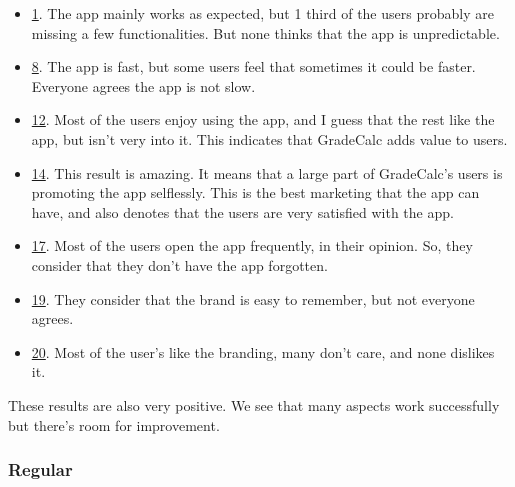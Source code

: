 \begin{itemize}[noitemsep]
    \item \hyperref[fig:question-plot-1]{1}. 
        The app mainly works as expected, but 1 third of the users probably are missing a few functionalities. But none thinks that the app is unpredictable.
    \item \hyperref[fig:question-plot-8]{8}. 
        The app is fast, but some users feel that sometimes it could be faster. Everyone agrees the app is not slow.
    \item \hyperref[fig:question-plot-12]{12}. 
        Most of the users enjoy using the app, and I guess that the rest like the app, but isn't very into it. This indicates that GradeCalc adds value to users. 
    \item \hyperref[fig:question-plot-14]{14}. 
        This result is amazing. It means that a large part of GradeCalc's users is promoting the app selflessly. This is the best marketing that the app can have, and also denotes that the users are very satisfied with the app.
    \item \hyperref[fig:question-plot-17]{17}. 
        Most of the users open the app frequently, in their opinion. So, they consider that they don't have the app forgotten.
    \item \hyperref[fig:question-plot-19]{19}. 
        They consider that the brand is easy to remember, but not everyone agrees. 
    \item \hyperref[fig:question-plot-20]{20}. 
        Most of the user's like the branding, many don't care, and none dislikes it.
\end{itemize}

\noindent
These results are also very positive. We see that many aspects work successfully but there's room for improvement.

\subsubsection{Regular}

